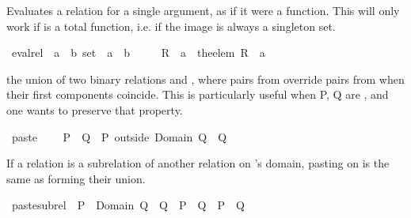 \begin{isabellebody}
\isamarkupfalse%
%
\endisatagproof
{\isafoldproof}%
%
\isadelimproof
%
\endisadelimproof
%
\isamarkuptrue%
%
\begin{isamarkuptext}%
Evaluates a relation  for a single argument, as if it were a function.
  This will only work if  is a total function, i.e. if the image is always a singleton set.%
\end{isamarkuptext}%
\isamarkuptrue%
\isamarkupfalse%
\ eval{\isacharunderscore}rel\ {\isacharcolon}{\isacharcolon}\ {\isachardoublequoteopen}{\isacharparenleft}{\isacharprime}a\ {\isasymtimes}\ {\isacharprime}b{\isacharparenright}\ set\ {\isasymRightarrow}\ {\isacharprime}a\ {\isasymRightarrow}\ {\isacharprime}b{\isachardoublequoteclose}\ {\isacharparenleft}\ {\isachardoublequoteopen}{\isacharcomma}{\isacharcomma}{\isachardoublequoteclose}\ {}{}{\isacharparenright}\ \isanewline
{}\ {\isachardoublequoteopen}R\ {\isacharcomma}{\isacharcomma}\ a\ {\isacharequal}\ the{\isacharunderscore}elem\ {\isacharparenleft}R\ {\isacharbackquote}{\isacharbackquote}\ {\isacharbraceleft}a{\isacharbraceright}{\isacharparenright}{\isachardoublequoteclose}%
\isamarkuptrue%
%
\begin{isamarkuptext}%
the union of two binary relations  and , where pairs from 
  override pairs from  when their first components coincide.
This is particularly useful when P, Q are , and one wants to preserve that property.%
\end{isamarkuptext}%
\isamarkuptrue%
\isamarkupfalse%
\ paste\ {\isacharparenleft}\ {\isachardoublequoteopen}{\isacharplus}{\isacharasterisk}{\isachardoublequoteclose}\ {}{}{\isacharparenright}\isanewline
{}\ {\isachardoublequoteopen}P\ {\isacharplus}{\isacharasterisk}\ Q\ {\isacharequal}\ {\isacharparenleft}P\ outside\ Domain\ Q{\isacharparenright}\ {\isasymunion}\ Q{\isachardoublequoteclose}%
\begin{isamarkuptext}%
If a relation  is a subrelation of another relation  on 's
  domain, pasting  on  is the same as forming their union.%
\end{isamarkuptext}%
\isamarkuptrue%
\isamarkupfalse%
\ paste{\isacharunderscore}subrel{\isacharcolon}\ \ {\isachardoublequoteopen}P\ {\isacharbar}{\isacharbar}\ Domain\ Q\ {\isasymsubseteq}\ Q{\isachardoublequoteclose}\ \ {\isachardoublequoteopen}P\ {\isacharplus}{\isacharasterisk}\ Q\ {\isacharequal}\ P\ {\isasymunion}\ Q{\isachardoublequoteclose}\isanewline

\end{isabellebody}
